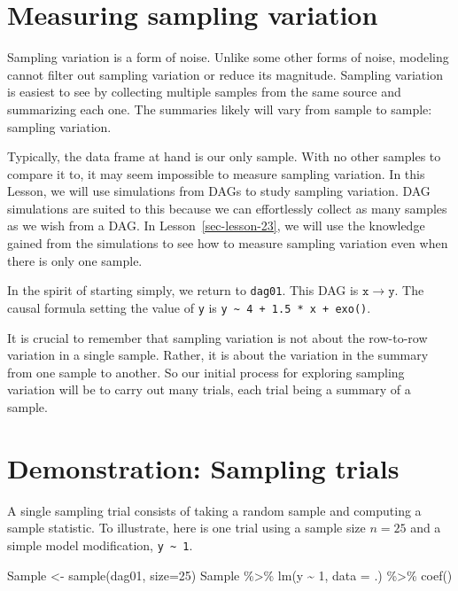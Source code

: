 \documentclass[
  letterpaper,
  DIV=11,
  numbers=noendperiod,
  oneside]{scrreprt}
\newenvironment{Shaded}{\begin{snugshade}}{\end{snugshade}}
\newcommand{\AttributeTok}[1]{\textcolor[rgb]{0.40,0.45,0.13}{#1}}
\newcommand{\DecValTok}[1]{\textcolor[rgb]{0.68,0.00,0.00}{#1}}
\newcommand{\FunctionTok}[1]{\textcolor[rgb]{0.28,0.35,0.67}{#1}}
\newcommand{\NormalTok}[1]{\textcolor[rgb]{0.00,0.23,0.31}{#1}}
\newcommand{\OtherTok}[1]{\textcolor[rgb]{0.00,0.23,0.31}{#1}}
\newcommand{\SpecialCharTok}[1]{\textcolor[rgb]{0.37,0.37,0.37}{#1}}
\begin{document}
\hypertarget{measuring-sampling-variation}{%
\section{Measuring sampling
variation}\label{measuring-sampling-variation}}

Sampling variation is a form of noise. Unlike some other forms of noise,
modeling cannot filter out sampling variation or reduce its magnitude.
Sampling variation is easiest to see by collecting multiple samples from
the same source and summarizing each one. The summaries likely will vary
from sample to sample: sampling variation.

Typically, the data frame at hand is our only sample. With no other
samples to compare it to, it may seem impossible to measure sampling
variation. In this Lesson, we will use simulations from DAGs to study
sampling variation. DAG simulations are suited to this because we can
effortlessly collect as many samples as we wish from a DAG. In
Lesson~\ref{sec-lesson-23}, we will use the knowledge gained from the
simulations to see how to measure sampling variation even when there is
only one sample.

In the spirit of starting simply, we return to \texttt{dag01}. This DAG
is \(\mathtt{x}\longrightarrow\mathtt{y}\). The causal formula setting
the value of \texttt{y} is
\texttt{y\ \textasciitilde{}\ 4\ +\ 1.5\ *\ x\ +\ exo()}.

It is crucial to remember that sampling variation is not about the
row-to-row variation in a single sample. Rather, it is about the
variation in the summary from one sample to another. So our initial
process for exploring sampling variation will be to carry out many
trials, each trial being a summary of a sample.

\hypertarget{demonstration-sampling-trials}{%
\section{Demonstration: Sampling
trials}\label{demonstration-sampling-trials}}

A single sampling trial consists of taking a random sample and computing
a sample statistic. To illustrate, here is one trial using a sample size
\(n=25\) and a simple model modification,
\texttt{y\ \textasciitilde{}\ 1}.

\begin{Shaded}
\begin{Highlighting}[]
\NormalTok{Sample }\OtherTok{\textless{}{-}} \FunctionTok{sample}\NormalTok{(dag01, }\AttributeTok{size=}\DecValTok{25}\NormalTok{) }
\NormalTok{Sample }\SpecialCharTok{\%\textgreater{}\%} 
  \FunctionTok{lm}\NormalTok{(y }\SpecialCharTok{\textasciitilde{}} \DecValTok{1}\NormalTok{, }\AttributeTok{data =}\NormalTok{ .) }\SpecialCharTok{\%\textgreater{}\%}
  \FunctionTok{coef}\NormalTok{()}
\end{Highlighting}
\end{Shaded}
\end{document}
